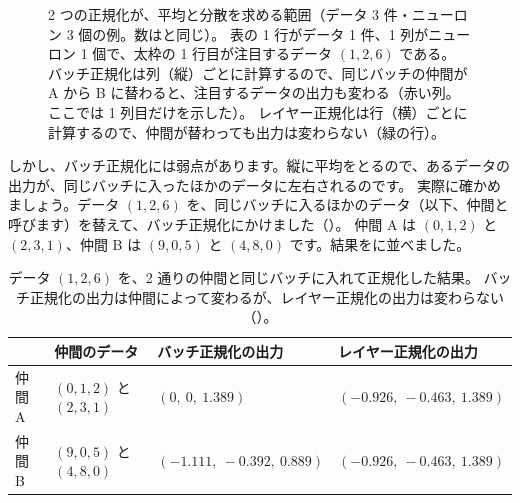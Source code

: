 \begin{figure}[tbp]
\caption{2 つの正規化が、平均と分散を求める範囲（データ 3 件・ニューロン 3 個の例。数はと同じ）。
表の 1 行がデータ 1 件、1 列がニューロン 1 個で、太枠の 1 行目が注目するデータ $(1,2,6)$ である。
バッチ正規化は列（縦）ごとに計算するので、同じバッチの仲間が A から B に替わると、注目するデータの出力も変わる（赤い列。ここでは 1 列目だけを示した）。
レイヤー正規化は行（横）ごとに計算するので、仲間が替わっても出力は変わらない（緑の行）。}
\label{fig:training-norm-axes}
\end{figure}

しかし、バッチ正規化には弱点があります。縦に平均をとるので、あるデータの出力が、同じバッチに入ったほかのデータに左右されるのです。
実際に確かめましょう。データ $(1, 2, 6)$ を、同じバッチに入るほかのデータ（以下、仲間と呼びます）を替えて、バッチ正規化にかけました（）。
仲間 A は $(0,1,2)$ と $(2,3,1)$、仲間 B は $(9,0,5)$ と $(4,8,0)$ です。結果をに並べました。

\begin{table}[tbp]
\centering
\caption{データ $(1,2,6)$ を、2 通りの仲間と同じバッチに入れて正規化した結果。
バッチ正規化の出力は仲間によって変わるが、レイヤー正規化の出力は変わらない（\protect{}）。}
\label{tab:training-bn-example}
\small
\begin{tabular}{llll}
\toprule
 & 仲間のデータ & バッチ正規化の出力 & レイヤー正規化の出力 \\
\midrule
仲間 A & $(0,1,2)$ と $(2,3,1)$ & $(0,\ 0,\ 1.389)$ & $(-0.926,\ -0.463,\ 1.389)$ \\
仲間 B & $(9,0,5)$ と $(4,8,0)$ & $(-1.111,\ -0.392,\ 0.889)$ & $(-0.926,\ -0.463,\ 1.389)$ \\
\bottomrule
\end{tabular}
\end{table}

